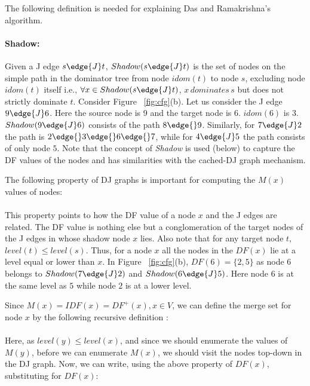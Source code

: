 The following definition is needed for explaining Das and Ramakrishna's
algorithm.


\paragraph{Shadow:}

Given a J edge $s\edge{J} t$, $Shadow(s\edge{J} t)$ is the set of nodes on the
simple path in the dominator tree from node $idom(t)$ to node $s$,
excluding node $idom(t)$ itself i.e., $\forall x\in Shadow(s\edge{J} t)$,
$x\, dominates\, s$ but does not strictly dominate $t$. 
Consider Figure ~\ref{fig:cfg}(b). Let us consider the J edge $9 \edge{J} 6$.
Here the source node is 9 and the target node is 6. $idom(6)$ is 3. 
$Shadow(9 \edge{J} 6)$ consists of the path $8 \edge{} 9$. Similarly, for $7 \edge{J} 2$
the path is $2 \edge{} 3 \edge{} 6 \edge{} 7$, while for $4 \edge{J} 5$ the 
path consists of only node $5$. Note that the concept of {\it Shadow} is used
(below) to capture the DF values of the nodes and has similarities with the cached-DJ graph mechanism.

The following property of DJ graphs is important for computing the $M(x)$ values of nodes:\\
\\
This property points to how the DF value of a node $x$ and the J edges 
are related. The DF value is nothing else but a conglomeration of the target
nodes of the J edges in whose shadow node $x$ lies. Also note that for any target node $t$,
$level(t) \leq level(s)$. Thus, for a node $x$ all the nodes in the $DF(x)$ lie at a level
equal or lower than $x$.
In Figure ~\ref{fig:cfg}(b), $DF(6) = \{2,5\}$ as node $6$ belongs to
$Shadow(7 \edge{J} 2)$ and $Shadow(6 \edge{J} 5)$. Here node $6$ is at the same level as $5$ while
node $2$ is at a lower level.

Since $M(x) = IDF(x) = DF^{+}(x), x \in V$, we can define the merge set for node $x$ by the
following recursive definition : \\
 \\
Here, as $level(y) \leq level(x)$, and since we should enumerate the values of $M(y)$,
before we can enumerate $M(x)$, we should visit the nodes top-down in the
DJ graph. Now, we can write, using the above property of $DF(x)$, substituting for $DF(x)$:\\

